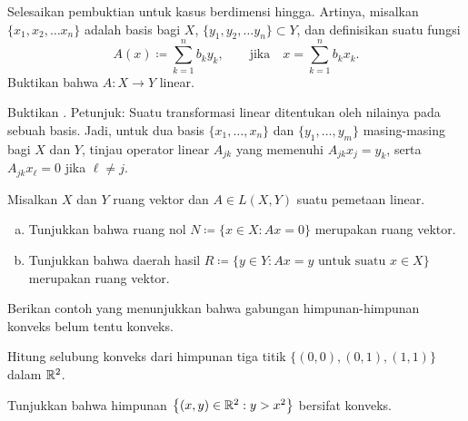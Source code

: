 \begin{exercise}
Selesaikan pembuktian  untuk kasus berdimensi hingga.
Artinya, misalkan
$\{ x_1, x_2,\ldots x_n \}$ adalah basis bagi $X$,
$\{ y_1, y_2,\ldots y_n \} \subset Y$, dan definisikan suatu
fungsi
\begin{equation*}
A(x) \coloneqq \sum_{k=1}^n b_k y_k, \qquad \text{jika} \quad x=\sum_{k=1}^n b_k x_k .
\end{equation*}
Buktikan bahwa $A \colon X \to Y$ linear.
\end{exercise}


\begin{exercise}
Buktikan .  Petunjuk: Suatu transformasi linear ditentukan oleh
nilainya pada sebuah basis.  Jadi, untuk dua basis
$\{ x_1,\ldots,x_n \}$ dan
$\{ y_1,\ldots,y_m \}$ masing-masing bagi $X$ dan $Y$, tinjau operator linear
$A_{jk}$ yang memenuhi $A_{jk} x_j = y_k$, serta
$A_{jk} x_\ell = 0$ jika $\ell \neq j$.
\end{exercise}

\begin{samepage}
\begin{exercise}[Mudah]
Misalkan $X$ dan $Y$ ruang vektor dan $A \in L(X,Y)$ suatu pemetaan
linear.
\begin{enumerate}[a)]
\item
Tunjukkan bahwa ruang nol $N \coloneqq \{ x \in X : Ax = 0 \}$ merupakan
ruang vektor.
\item
Tunjukkan bahwa daerah hasil $R \coloneqq \{ y \in Y : Ax = y \text{ untuk suatu } x \in X \}$ merupakan
ruang vektor.
\end{enumerate}
\end{exercise}
\end{samepage}

\begin{exercise}[Mudah]
Berikan contoh yang menunjukkan bahwa gabungan himpunan-himpunan konveks belum tentu konveks.
\end{exercise}

\begin{exercise}
Hitung selubung konveks dari himpunan tiga titik
$\bigl\{ (0,0), (0,1), (1,1) \bigr\}$
dalam ${\mathbb{R}}^2$.
\end{exercise}

\begin{exercise}
Tunjukkan bahwa himpunan $\bigl\{ (x,y) \in {\mathbb{R}}^2 : y > x^2 \bigr\}$ bersifat konveks.
\end{exercise}

